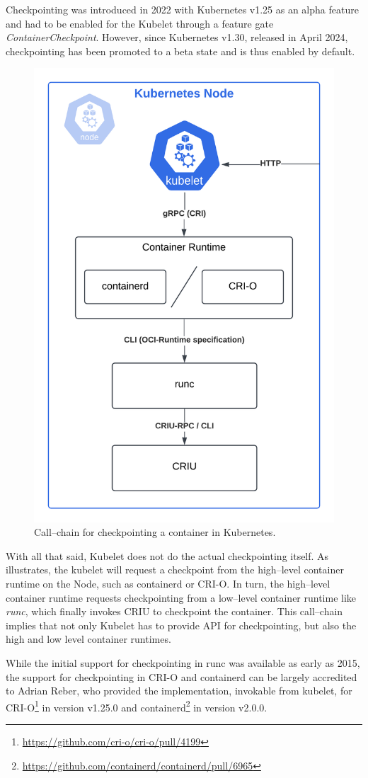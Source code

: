 \documentclass[
  digital,     %
  oneside,     %
  nosansbold,  %
  nocolorbold, %
  lof,         %
  nolot,         %
]{fithesis4}
\begin{document}
Checkpointing was introduced in 2022 with Kubernetes v1.25 as an alpha feature and had to be enabled for the Kubelet through a feature gate \emph{ContainerCheckpoint}. However, since Kubernetes v1.30, released in April 2024, checkpointing has been promoted to a beta state and is thus enabled by default.

\begin{figure}[H]
  \begin{center}
  \includegraphics[width=.6\textwidth]{figures/checkpoint-callchain.png}
  \end{center}
  \caption{Call--chain for checkpointing a container in Kubernetes.}
  \label{fig:criu-calltrace}
\end{figure}

With all that said, Kubelet does not do the actual checkpointing itself. As  illustrates, the kubelet will request a checkpoint from the high--level container runtime on the Node, such as containerd or CRI-O. In turn, the high--level container runtime requests checkpointing from a low--level container runtime like \emph{runc}, which finally invokes CRIU to checkpoint the container. This call--chain implies that not only Kubelet has to provide API for checkpointing, but also the high and low level container runtimes.

While the initial support for checkpointing in runc was available as early as 2015, the support for checkpointing in CRI-O and containerd can be largely accredited to Adrian Reber, who provided the implementation, invokable from kubelet, for CRI-O\footnote{\url{https://github.com/cri-o/cri-o/pull/4199}} in version v1.25.0 and containerd\footnote{\url{https://github.com/containerd/containerd/pull/6965}} in version v2.0.0.
\end{document}
